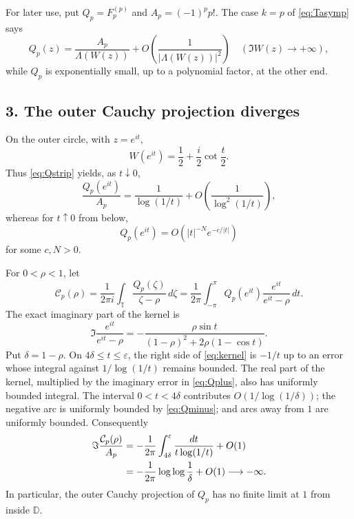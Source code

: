 \documentclass[11pt]{article}
\newcommand{\D}{\mathbb D}
\newcommand{\T}{\mathbb T}
\begin{document}
For later use, put $Q_p=F_p^{(p)}$ and $A_p=(-1)^p p!$.  The case $k=p$ of
\eqref{eq:Tasymp} says
\begin{equation}\label{eq:Qstrip}
 Q_p(z)=\frac{A_p}{\Lambda(W(z))}
 +O\!\left(\frac1{|\Lambda(W(z))|^2}\right)
 \quad(\Im W(z)\to+\infty),
\end{equation}
while $Q_p$ is exponentially small, up to a polynomial factor, at the other
end.

\subsection*{3. The outer Cauchy projection diverges}

On the outer circle, with $z=e^{it}$,
\begin{equation}\label{eq:wt}
 W(e^{it})=\frac12+\frac{i}{2}\cot\frac t2.
\end{equation}
Thus \eqref{eq:Qstrip} yields, as $t\downarrow0$,
\begin{equation}\label{eq:Qplus}
 \frac{Q_p(e^{it})}{A_p}
 =\frac1{\log(1/t)}+O\!\left(\frac1{\log^2(1/t)}\right),
\end{equation}
whereas for $t\uparrow0$ from below,
\begin{equation}\label{eq:Qminus}
 Q_p(e^{it})=O\!\left(|t|^{-N}e^{-c/|t|}\right)
\end{equation}
for some $c,N>0$.

For $0<\rho<1$, let
\[
 \mathcal C_p(\rho)=\frac1{2\pi i}\int_{\T}
 \frac{Q_p(\zeta)}{\zeta-\rho}\,d\zeta
 =\frac1{2\pi}\int_{-\pi}^{\pi}Q_p(e^{it})
 \frac{e^{it}}{e^{it}-\rho}\,dt.
\]
The exact imaginary part of the kernel is
\begin{equation}\label{eq:kernel}
 \Im\frac{e^{it}}{e^{it}-\rho}
 =-\frac{\rho\sin t}{(1-\rho)^2+2\rho(1-\cos t)}.
\end{equation}
Put $\delta=1-\rho$.  On $4\delta\leq t\leq\varepsilon$, the right side of
\eqref{eq:kernel} is $-1/t$ up to an error whose integral against
$1/\log(1/t)$ remains bounded.  The real part of the kernel, multiplied by
the imaginary error in \eqref{eq:Qplus}, also has uniformly bounded integral.
The interval $0<t<4\delta$ contributes $O(1/\log(1/\delta))$; the negative
arc is uniformly bounded by \eqref{eq:Qminus}; and arcs away from $1$ are
uniformly bounded.  Consequently
\begin{align}
 \Im\frac{\mathcal C_p(\rho)}{A_p}
 &=-\frac1{2\pi}\int_{4\delta}^{\varepsilon}
   \frac{dt}{t\log(1/t)}+O(1)\notag\\
 &=-\frac1{2\pi}\log\log\frac1\delta+O(1)
 \longrightarrow-\infty.\label{eq:loglog}
\end{align}
In particular, the outer Cauchy projection of $Q_p$ has no finite limit at
$1$ from inside $\D$.
\end{document}
